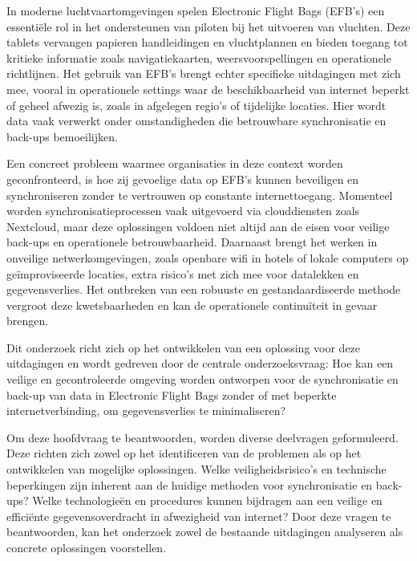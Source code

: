 


In moderne luchtvaartomgevingen spelen Electronic Flight Bags (EFB's) een essentiële rol in het ondersteunen van piloten bij het uitvoeren van vluchten. Deze tablets vervangen papieren handleidingen en vluchtplannen en bieden toegang tot kritieke informatie zoals navigatiekaarten, weersvoorspellingen en operationele richtlijnen. Het gebruik van EFB's brengt echter specifieke uitdagingen met zich mee, vooral in operationele settings waar de beschikbaarheid van internet beperkt of geheel afwezig is, zoals in afgelegen regio's of tijdelijke locaties. Hier wordt data vaak verwerkt onder omstandigheden die betrouwbare synchronisatie en back-ups bemoeilijken.

Een concreet probleem waarmee organisaties in deze context worden geconfronteerd, is hoe zij gevoelige data op EFB's kunnen beveiligen en synchroniseren zonder te vertrouwen op constante internettoegang. Momenteel worden synchronisatieprocessen vaak uitgevoerd via clouddiensten zoals Nextcloud, maar deze oplossingen voldoen niet altijd aan de eisen voor veilige back-ups en operationele betrouwbaarheid. Daarnaast brengt het werken in onveilige netwerkomgevingen, zoals openbare wifi in hotels of lokale computers op geïmproviseerde locaties, extra risico’s met zich mee voor datalekken en gegevensverlies. Het ontbreken van een robuuste en gestandaardiseerde methode vergroot deze kwetsbaarheden en kan de operationele continuïteit in gevaar brengen.

Dit onderzoek richt zich op het ontwikkelen van een oplossing voor deze uitdagingen en wordt gedreven door de centrale onderzoeksvraag:
Hoe kan een veilige en gecontroleerde omgeving worden ontworpen voor de synchronisatie en back-up van data in Electronic Flight Bags zonder of met beperkte internetverbinding, om gegevensverlies te minimaliseren?

Om deze hoofdvraag te beantwoorden, worden diverse deelvragen geformuleerd. Deze richten zich zowel op het identificeren van de problemen als op het ontwikkelen van mogelijke oplossingen.
Welke veiligheidsrisico’s en technische beperkingen zijn inherent aan de huidige methoden voor synchronisatie en back-ups?
Welke technologieën en procedures kunnen bijdragen aan een veilige en efficiënte gegevensoverdracht in afwezigheid van internet?
Door deze vragen te beantwoorden, kan het onderzoek zowel de bestaande uitdagingen analyseren als concrete oplossingen voorstellen.

